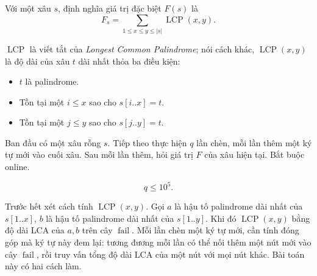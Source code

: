 \documentclass[11pt]{article}
\begin{document}
Với một xâu \(s\), định nghĩa giá trị đặc biệt \(F(s)\) là
\[
F_s=\sum_{1\le x\le y\le |s|} \operatorname{LCP}(x,y).
\]

\(\operatorname{LCP}\) là viết tắt của \emph{Longest Common Palindrome}; nói
cách khác, \(\operatorname{LCP}(x,y)\) là độ dài của xâu \(t\) dài nhất thỏa
ba điều kiện:

\begin{itemize}
  \item \(t\) là palindrome.
  \item Tồn tại một \(i\le x\) sao cho \(s[i..x]=t\).
  \item Tồn tại một \(j\le y\) sao cho \(s[j..y]=t\).
\end{itemize}

Ban đầu có một xâu rỗng \(s\). Tiếp theo thực hiện \(q\) lần chèn, mỗi lần
thêm một ký tự mới vào cuối xâu. Sau mỗi lần thêm, hỏi giá trị \(F\) của xâu
hiện tại. Bắt buộc online.

\[
q\le 10^5.
\]

Trước hết xét cách tính \(\operatorname{LCP}(x,y)\). Gọi \(a\) là hậu tố
palindrome dài nhất của \(s[1..x]\), \(b\) là hậu tố palindrome dài nhất của
\(s[1..y]\). Khi đó \(\operatorname{LCP}(x,y)\) bằng độ dài LCA của \(a,b\)
trên cây \(\operatorname{fail}\). Mỗi lần chèn một ký tự mới, cần tính đóng
góp mà ký tự này đem lại: tương đương mỗi lần có thể nối thêm một nút mới vào
cây \(\operatorname{fail}\), rồi truy vấn tổng độ dài LCA của một nút với mọi
nút khác. Bài toán này có hai cách làm.
\end{document}
